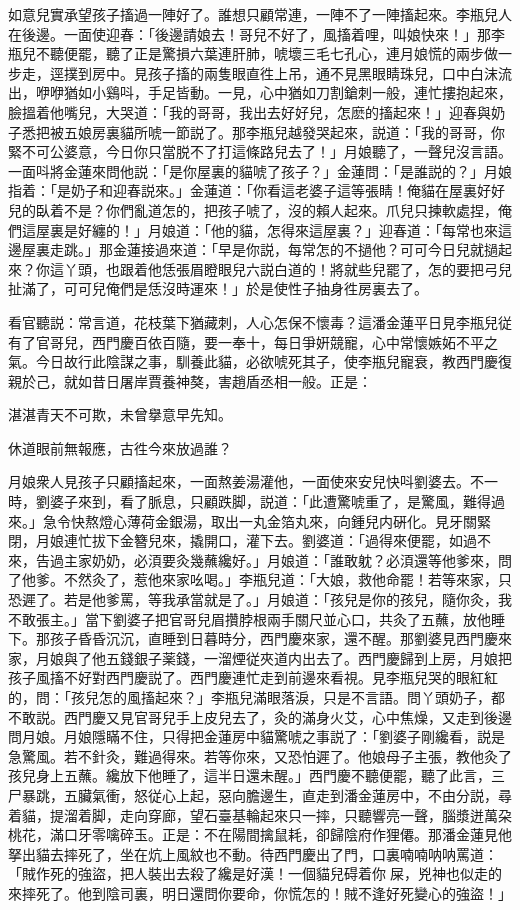 如意兒實承望孩子搐過一陣好了。誰想只顧常連，一陣不了一陣搐起來。李瓶兒人在後邊。一面使迎春：「後邊請娘去！哥兒不好了，風搐着哩，叫娘快來！」那李瓶兒不聽便罷，聽了正是驚損六葉連肝肺，唬壞三毛七孔心，連月娘慌的兩步做一步走，逕撲到房中。見孩子搐的兩隻眼直徃上吊，通不見黑眼睛珠兒，口中白沫流出，咿咿猶如小鷄呌，手足皆動。一見，心中猶如刀割鎗刺一般，連忙摟抱起來，臉搵着他嘴兒，大哭道：「我的哥哥，我出去好好兒，怎麽的搐起來！」迎春與奶子悉把被五娘房裏貓所唬一節説了。那李瓶兒越發哭起來，説道：「我的哥哥，你緊不可公婆意，今日你只當脱不了打這條路兒去了！」月娘聽了，一聲兒沒言語。一面呌將金蓮來問他説：「是你屋裏的貓唬了孩子？」金蓮問：「是誰説的？」月娘指着：「是奶子和迎春説來。」金蓮道：「你看這老婆子這等張睛！俺貓在屋裏好好兒的臥着不是？你們亂道怎的，把孩子唬了，沒的賴人起來。爪兒只揀軟處捏，俺們這屋裏是好纏的！」月娘道：「他的貓，怎得來這屋裏？」迎春道：「每常也來這邊屋裏走跳。」那金蓮接過來道：「早是你説，每常怎的不撾他？可可今日兒就撾起來？你這丫頭，也跟着他恁張眉瞪眼兒六説白道的！將就些兒罷了，怎的要把弓兒扯滿了，可可兒俺們是恁沒時運來！」於是使性子抽身徃房裏去了。

看官聽説：常言道，花枝葉下猶藏刺，人心怎保不懷毒？這潘金蓮平日見李瓶兒従有了官哥兒，西門慶百依百隨，要一奉十，每日爭姸競寵，心中常懷嫉妬不平之氣。今日故行此陰謀之事，馴養此貓，必欲唬死其子，使李瓶兒寵衰，教西門慶復親於己，就如昔日屠岸賈養神獒，害趙盾丞相一般。正是：

\begin{myquote}
湛湛青天不可欺，未曾擧意早先知。

休道眼前無報應，古徃今來放過誰？
\end{myquote}

月娘衆人見孩子只顧搐起來，一面熬姜湯灌他，一面使來安兒快呌劉婆去。不一時，劉婆子來到，看了脈息，只顧跌脚，説道：「此遭驚唬重了，是驚風，難得過來。」急令快熬燈心薄荷金銀湯，取出一丸金箔丸來，向鍾兒内硏化。見牙關緊閉，月娘連忙拔下金簪兒來，撬開口，灌下去。劉婆道：「過得來便罷，如過不來，告過主家奶奶，必湏要灸幾蘸纔好。」月娘道：「誰敢躭？必湏還等他爹來，問了他爹。不然灸了，惹他來家吆喝。」李瓶兒道：「大娘，救他命罷！若等來家，只恐遲了。若是他爹罵，等我承當就是了。」月娘道：「孩兒是你的孩兒，隨你灸，我不敢張主。」當下劉婆子把官哥兒眉攢脖根兩手關尺並心口，共灸了五蘸，放他睡下。那孩子昏昏沉沉，直睡到日暮時分，西門慶來家，還不醒。那劉婆見西門慶來家，月娘與了他五錢銀子薬錢，一溜煙従夾道内出去了。西門慶歸到上房，月娘把孩子風搐不好對西門慶説了。西門慶連忙走到前邊來看視。見李瓶兒哭的眼紅紅的，問：「孩兒怎的風搐起來？」李瓶兒滿眼落淚，只是不言語。問丫頭奶子，都不敢説。西門慶又見官哥兒手上皮兒去了，灸的滿身火艾，心中焦燥，又走到後邊問月娘。月娘隱瞞不住，只得把金蓮房中貓驚唬之事説了：「劉婆子剛纔看，説是急驚風。若不針灸，難過得來。若等你來，又恐怕遲了。他娘母子主張，教他灸了孩兒身上五蘸。纔放下他睡了，這半日還未醒。」西門慶不聽便罷，聽了此言，三尸暴跳，五臟氣衝，怒従心上起，惡向膽邊生，直走到潘金蓮房中，不由分説，尋着貓，提溜着脚，走向穿廊，望石臺基輪起來只一摔，只聽響亮一聲，腦漿迸萬朶桃花，滿口牙零噙碎玉。正是：不在陽間擒鼠耗，卻歸陰府作狸僊。那潘金蓮見他拏出貓去摔死了，坐在炕上風紋也不動。待西門慶出了門，口裏喃喃呐呐罵道：「賊作死的強盜，把人裝出去殺了纔是好漢！一個貓兒碍着你𠳹屎，兇神也似走的來摔死了。他到陰司裏，明日還問你要命，你慌怎的！賊不逢好死變心的強盜！」

